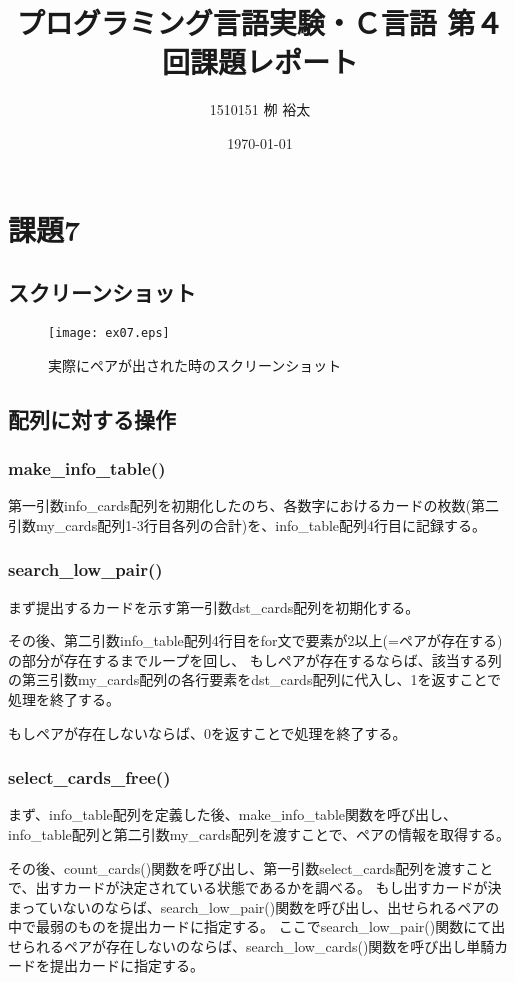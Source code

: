\documentclass[11pt,a4paper, uplatex]{jsarticle}
\title{プログラミング言語実験・Ｃ言語 第４回課題レポート}
\author{1510151  栁 裕太}
\date{\today}
\begin{document}
\maketitle
\section{課題7}
%
\subsection{スクリーンショット}

\begin{figure}[h]
  \centering
  \caption{実際にペアが出された時のスクリーンショット}
  \texttt{[image: ex07.eps]}
\end{figure}

\subsection{配列に対する操作}
\subsubsection{make_info_table()}
第一引数info_cards配列を初期化したのち、各数字におけるカードの枚数(第二引数my_cards配列1-3行目各列の合計)を、info_table配列4行目に記録する。
\subsubsection{search_low_pair()}
まず提出するカードを示す第一引数dst_cards配列を初期化する。

その後、第二引数info_table配列4行目をfor文で要素が2以上(=ペアが存在する)の部分が存在するまでループを回し、
もしペアが存在するならば、該当する列の第三引数my_cards配列の各行要素をdst_cards配列に代入し、1を返すことで処理を終了する。

もしペアが存在しないならば、0を返すことで処理を終了する。
\subsubsection{select_cards_free()}
まず、info_table配列を定義した後、make_info_table関数を呼び出し、info_table配列と第二引数my_cards配列を渡すことで、ペアの情報を取得する。

その後、count_cards()関数を呼び出し、第一引数select_cards配列を渡すことで、出すカードが決定されている状態であるかを調べる。
もし出すカードが決まっていないのならば、search_low_pair()関数を呼び出し、出せられるペアの中で最弱のものを提出カードに指定する。
ここでsearch_low_pair()関数にて出せられるペアが存在しないのならば、search_low_cards()関数を呼び出し単騎カードを提出カードに指定する。
\end{document}
